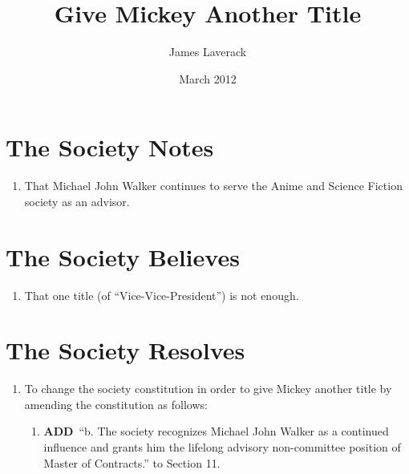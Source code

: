 \documentclass[a4paper,10pt]{article}
\title{Give Mickey Another Title}
\author{James Laverack}
\date{March 2012}
\newcommand{\add}{\textbf{ADD}\ }
\begin{document}
\maketitle

\section*{The Society Notes}
\begin{enumerate}
  \item That Michael John Walker continues to serve the Anime and Science Fiction society as an advisor.
\end{enumerate}

\section*{The Society Believes}
\begin{enumerate}
  \item That one title (of ``Vice-Vice-President'') is not enough.
\end{enumerate}

\section*{The Society Resolves}
\begin{enumerate}
  \item To change the society constitution in order to give Mickey another title by amending the constitution as follows:
  \begin{enumerate}
    \item \add ``b.  The society recognizes Michael John Walker as a continued influence and grants him the lifelong advisory non-committee position of Master of Contracts.'' to Section 11.
  \end{enumerate}
\end{enumerate}
\end{document}
